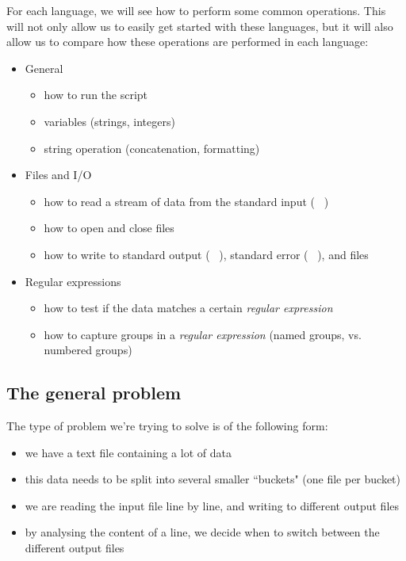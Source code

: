 For each language, we will see how to perform some common operations. This will not only allow us to easily get started with these languages, but it will also allow us to compare how these operations are performed in each language: \\
\begin{itemize}
	\item General
	\begin{itemize}
		\item how to run the script
		\item variables (strings, integers)
		\item string operation (concatenation, formatting)
	\end{itemize}
	\item Files and I/O
	\begin{itemize}
		\item how to read a stream of data from the standard input ( \stdin\ )
		\item how to open and close files
		\item how to write to standard output ( \stdout\ ), standard error ( \stderr\ ), and files
	\end{itemize}
	\item Regular expressions
	\begin{itemize}
		\item how to test if the data matches a certain \emph{regular expression}
		\item how to capture groups in a \emph{regular expression} (named groups, vs. numbered groups)
	\end{itemize}
\end{itemize}


\medskip

\subsection*{The general problem}


The type of problem we're trying to solve is of the following form:

\begin{itemize}
	\item we have a text file containing a lot of data
	\item this data needs to be split into several smaller ``buckets" (one file per bucket)
	\item we are reading the input file line by line, and writing to different output files
	\item by analysing the content of a line, we decide when to switch between the different output files
\end{itemize}


